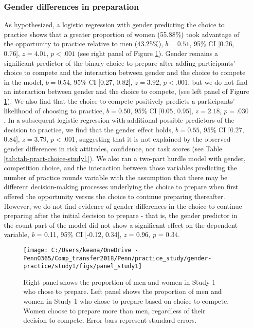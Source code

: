 \documentclass[letterpaper, nobind]{templates/ociamthesis}
\begin{document}
\hypertarget{gender-differences-in-preparation}{%
\subsubsection{Gender differences in preparation}\label{gender-differences-in-preparation}}

As hypothesized, a logistic regression with gender predicting the choice to practice shows that a greater proportion of women (55.88\%) took advantage of the opportunity to practice relative to men (43.25\%), \(b = 0.51\), 95\% CI \([0.26\), \(0.76]\), \(z = 4.01\), \(p < .001\) (see right panel of Figure \ref{fig:panel-study1}). Gender remains a significant predictor of the binary choice to prepare after adding participants' choice to compete and the interaction between gender and the choice to compete in the model, \(b = 0.54\), 95\% CI \([0.27\), \(0.82]\), \(z = 3.92\), \(p < .001\), but we do not find an interaction between gender and the choice to compete, (see left panel of Figure \ref{fig:panel-study1}). We also find that the choice to compete positively predicts a participants' likelihood of choosing to practice, \(b = 0.50\), 95\% CI \([0.05\), \(0.95]\), \(z = 2.18\), \(p = .030\). In a subsequent logistic regression with additional possible predictors of the decision to practice, we find that the gender effect holds, \(b = 0.55\), 95\% CI \([0.27\), \(0.84]\), \(z = 3.79\), \(p < .001\), suggesting that it is not explained by the observed gender differences in risk attitudes, confidence, nor task scores (see Table \ref{tab:tab-pract-choice-study1}). We also ran a two-part hurdle model with gender, competition choice, and the interaction between those variables predicting the number of practice rounds variable with the assumption that there may be different decision-making processes underlying the choice to prepare when first offered the opportunity versus the choice to continue preparing thereafter. However, we do not find evidence of gender differences in the choice to continue preparing after the initial decision to prepare - that is, the gender predictor in the count part of the model did not show a significant effect on the dependent variable, \emph{b} = 0.11, 95\% CI {[}-0.12, 0.34{]}, \emph{z} = 0.96, \emph{p} = 0.34.

\begin{figure}

{\centering \texttt{[image: C:/Users/keana/OneDrive - PennO365/Comp\_transfer2018/Penn/practice\_study/gender-practice/study1/figs/panel\_study1]} 

}

\caption{Right panel shows the proportion of men and women in Study 1 who chose to prepare. Left panel shows the proportion of men and women in Study 1 who chose to prepare based on choice to compete. Women choose to prepare more than men, regardless of their decision to compete. Error bars represent standard errors.}\label{fig:panel-study1}
\end{figure}
\end{document}

